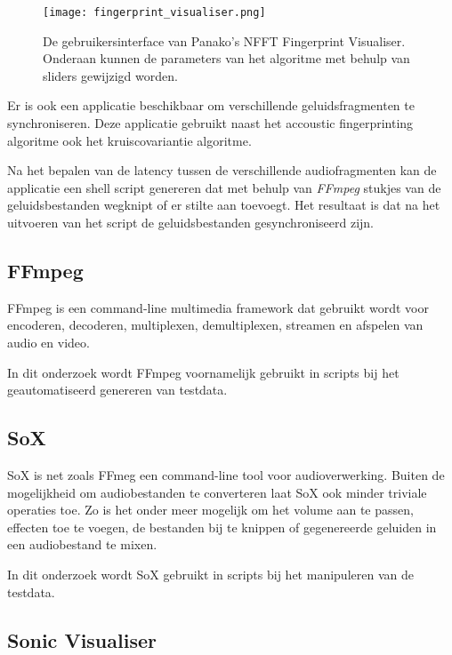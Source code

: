 \begin{figure}[!h]
	\captionsetup{width=0.8\textwidth}
	\caption[Gebruikersinterface van Audacity]{De gebruikersinterface van Panako's NFFT Fingerprint Visualiser. Onderaan kunnen de parameters van het algoritme met behulp van sliders gewijzigd worden.}
	\centering
	\advance\parskip0.3cm
	\texttt{[image: fingerprint\_visualiser.png]}
	\label{fingerprint_visualiser}
\end{figure}

Er is ook een applicatie beschikbaar om verschillende geluidsfragmenten te synchroniseren. Deze applicatie gebruikt naast het accoustic fingerprinting algoritme ook het kruiscovariantie algoritme. 

Na het bepalen van de latency tussen de verschillende audiofragmenten kan de applicatie een shell script genereren dat met behulp van \textit{FFmpeg} stukjes van de geluidsbestanden wegknipt of er stilte aan toevoegt. Het resultaat is dat na het uitvoeren van het script de geluidsbestanden gesynchroniseerd zijn.

\subsection{FFmpeg}

FFmpeg is een command-line multimedia framework dat gebruikt wordt voor encoderen, decoderen, multiplexen, demultiplexen, streamen en afspelen van audio en video. \cite{kollarconfiguration}

In dit onderzoek wordt FFmpeg voornamelijk gebruikt in scripts bij het geautomatiseerd genereren van testdata.

\subsection{SoX}

SoX is net zoals FFmeg een command-line tool voor audioverwerking. Buiten de mogelijkheid om audiobestanden te converteren laat SoX ook minder triviale operaties toe. Zo is het onder meer mogelijk om het volume aan te passen, effecten toe te voegen, de bestanden bij te knippen of gegenereerde geluiden in een audiobestand te mixen.
\cite{barras2012sox}

In dit onderzoek wordt SoX gebruikt in scripts bij het manipuleren van de testdata.

\subsection{Sonic Visualiser}

